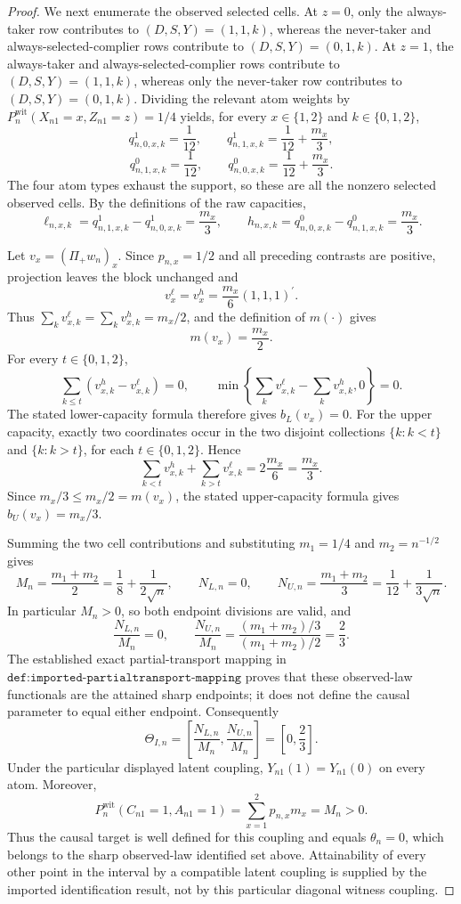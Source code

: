 \documentclass{article}
\begin{document}
\begin{proof}
We next enumerate the observed selected cells. At \(z=0\), only the always-taker row contributes to \((D,S,Y)=(1,1,k)\), whereas the never-taker and always-selected-complier rows contribute to \((D,S,Y)=(0,1,k)\). At \(z=1\), the always-taker and always-selected-complier rows contribute to \((D,S,Y)=(1,1,k)\), whereas only the never-taker row contributes to \((D,S,Y)=(0,1,k)\). Dividing the relevant atom weights by \(P_n^{\mathrm{wit}}(X_{n1}=x,Z_{n1}=z)=1/4\) yields, for every \(x\in\{1,2\}\) and \(k\in\{0,1,2\}\),
\[
q^1_{n,0,x,k}=\frac1{12},
\qquad
q^1_{n,1,x,k}=\frac1{12}+\frac{m_x}{3},
\]
\[
q^0_{n,1,x,k}=\frac1{12},
\qquad
q^0_{n,0,x,k}=\frac1{12}+\frac{m_x}{3}.
\]
The four atom types exhaust the support, so these are all the nonzero selected observed cells. By the definitions of the raw capacities,
\[
\ell_{n,x,k}=q^1_{n,1,x,k}-q^1_{n,0,x,k}=\frac{m_x}{3},
\qquad
h_{n,x,k}=q^0_{n,0,x,k}-q^0_{n,1,x,k}=\frac{m_x}{3}.
\]

Let \(v_x=(\Pi_+w_n)_x\). Since \(p_{n,x}=1/2\) and all preceding contrasts are positive, projection leaves the block unchanged and
\[
v_x^\ell=v_x^h=\frac{m_x}{6}(1,1,1)^{\prime}.
\]
Thus \(\sum_kv_{x,k}^\ell=\sum_kv_{x,k}^h=m_x/2\), and the definition of \(m(\cdot)\) gives
\[
m(v_x)=\frac{m_x}{2}.
\]
For every \(t\in\{0,1,2\}\),
\[
\sum_{k\leq t}(v_{x,k}^h-v_{x,k}^\ell)=0,
\qquad
\min\!\left\{\sum_kv_{x,k}^\ell-\sum_kv_{x,k}^h,0\right\}=0.
\]
The stated lower-capacity formula therefore gives \(b_L(v_x)=0\). For the upper capacity, exactly two coordinates occur in the two disjoint collections \(\{k:k<t\}\) and \(\{k:k>t\}\), for each \(t\in\{0,1,2\}\). Hence
\[
\sum_{k<t}v_{x,k}^h+\sum_{k>t}v_{x,k}^\ell
=2\frac{m_x}{6}=\frac{m_x}{3}.
\]
Since \(m_x/3\leq m_x/2=m(v_x)\), the stated upper-capacity formula gives \(b_U(v_x)=m_x/3\).

Summing the two cell contributions and substituting \(m_1=1/4\) and \(m_2=n^{-1/2}\) gives
\[
M_n=\frac{m_1+m_2}{2}=\frac18+\frac1{2\sqrt n},
\qquad
N_{L,n}=0,
\qquad
N_{U,n}=\frac{m_1+m_2}{3}=\frac1{12}+\frac1{3\sqrt n}.
\]
In particular \(M_n>0\), so both endpoint divisions are valid, and
\[
\frac{N_{L,n}}{M_n}=0,
\qquad
\frac{N_{U,n}}{M_n}
=\frac{(m_1+m_2)/3}{(m_1+m_2)/2}=\frac23.
\]
The established exact partial-transport mapping in \(\texttt{def:imported-partialtransport-mapping}\) proves that these observed-law functionals are the attained sharp endpoints; it does not define the causal parameter to equal either endpoint. Consequently
\[
\Theta_{I,n}=\left[\frac{N_{L,n}}{M_n},\frac{N_{U,n}}{M_n}\right]
=\left[0,\frac23\right].
\]
Under the particular displayed latent coupling, \(Y_{n1}(1)=Y_{n1}(0)\) on every atom. Moreover,
\[
P_n^{\mathrm{wit}}(C_{n1}=1,A_{n1}=1)
=\sum_{x=1}^2p_{n,x}m_x=M_n>0.
\]
Thus the causal target is well defined for this coupling and equals \(\theta_n=0\), which belongs to the sharp observed-law identified set above. Attainability of every other point in the interval by a compatible latent coupling is supplied by the imported identification result, not by this particular diagonal witness coupling.


\end{proof}
\end{document}
